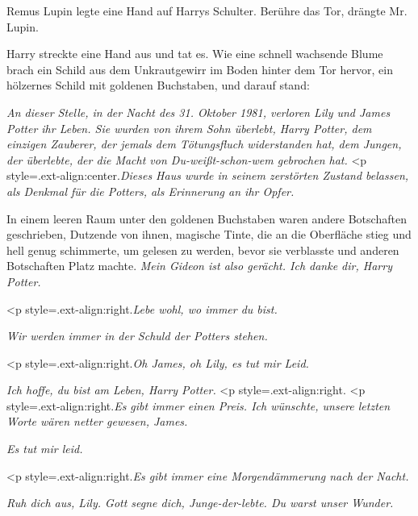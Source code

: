 Remus Lupin legte eine Hand auf Harrys Schulter. \glqq{}Berühre das Tor\grqq{},
drängte Mr. Lupin.

Harry streckte eine Hand aus und tat es. Wie eine schnell wachsende Blume brach
ein Schild aus dem Unkrautgewirr im Boden hinter dem Tor hervor, ein hölzernes
Schild mit goldenen Buchstaben, und darauf stand:

\emph{An dieser Stelle, in der Nacht
des 31. Oktober 1981, verloren Lily und James Potter ihr Leben. Sie wurden von
ihrem Sohn überlebt, Harry Potter, dem einzigen Zauberer, der jemals dem
Tötungsfluch widerstanden hat, dem Jungen, der überlebte, der die Macht von
Du-weißt-schon-wem gebrochen hat.}   <p
style=\grqq{}.ext-align:center\grqq{}.\emph{Dieses Haus wurde in seinem
zerstörten Zustand belassen, als Denkmal für die Potters, als Erinnerung an ihr
Opfer.}

In einem leeren Raum unter den goldenen Buchstaben waren andere Botschaften
geschrieben, Dutzende von ihnen, magische Tinte, die an die Oberfläche stieg und
hell genug schimmerte, um gelesen zu werden, bevor sie verblasste und anderen
Botschaften Platz machte.
\emph{Mein Gideon ist also gerächt. Ich danke dir, Harry Potter.}

<p style=\grqq{}.ext-align:right\grqq{}.\emph{Lebe wohl, wo immer du bist.}

\emph{Wir werden immer in der Schuld der Potters stehen.}

<p style=\grqq{}.ext-align:right\grqq{}.\emph{Oh James, oh Lily, es tut mir
Leid.}

\emph{Ich hoffe, du bist am Leben, Harry Potter.}
<p style=\grqq{}.ext-align:right\grqq{}.  <p
style=\grqq{}.ext-align:right\grqq{}.\emph{Es gibt immer einen Preis. Ich
wünschte, unsere letzten Worte wären netter gewesen, James.}

\emph{Es tut mir leid.}

<p style=\grqq{}.ext-align:right\grqq{}.\emph{Es gibt immer eine Morgendämmerung
nach der Nacht.}

\emph{Ruh dich aus, Lily. Gott segne dich, Junge-der-lebte. Du warst unser
Wunder.}

